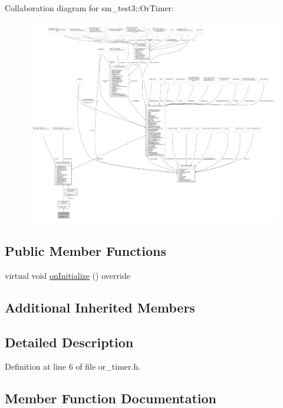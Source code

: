 Collaboration diagram for sm\+\_\+test3\+:\+:Or\+Timer\+:
\nopagebreak
\begin{figure}[H]
\begin{center}
\leavevmode
\includegraphics[width=350pt]{classsm__test3_1_1OrTimer__coll__graph}
\end{center}
\end{figure}
\subsection*{Public Member Functions}
\begin{DoxyCompactItemize}
\item 
virtual void \hyperlink{classsm__test3_1_1OrTimer_a38a0de6a293839157c6cdfa9f9da90aa}{on\+Initialize} () override
\end{DoxyCompactItemize}
\subsection*{Additional Inherited Members}


\subsection{Detailed Description}


Definition at line 6 of file or\+\_\+timer.\+h.



\subsection{Member Function Documentation}
\mbox{\label{classsm__test3_1_1OrTimer_a38a0de6a293839157c6cdfa9f9da90aa}} 
